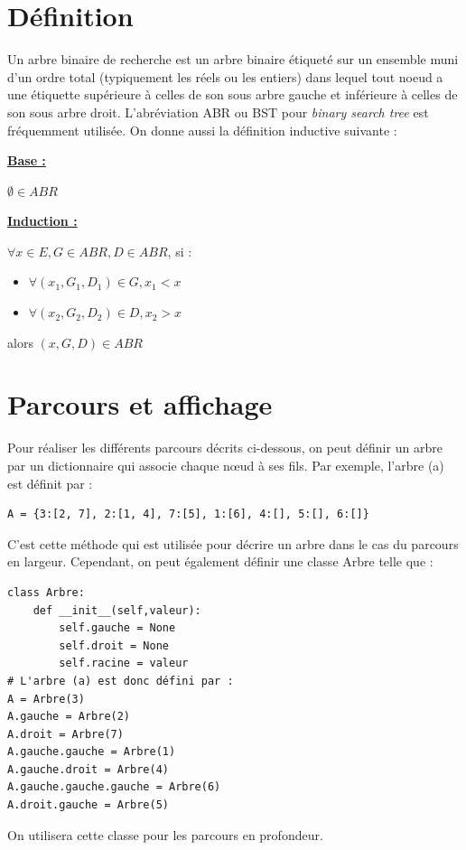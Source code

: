 \documentclass{report}
\begin{document}
\section{Définition}
Un arbre binaire de recherche est un arbre binaire étiqueté sur un ensemble muni d'un ordre total (typiquement les réels ou les entiers) dans lequel tout noeud a une étiquette supérieure à celles de son sous arbre gauche et inférieure à celles de son sous arbre droit. L'abréviation ABR ou BST pour \textit{binary search tree} est fréquemment utilisée. On donne aussi la définition inductive suivante :
\begin{flushleft}
    \bf
    \underline{Base :}
    
\end{flushleft}
$\emptyset \in ABR$
\begin{flushleft}
    \bf
    \underline{Induction :}
\end{flushleft}
    $\forall x \in E, G \in ABR, D \in ABR$, si :
    \begin{itemize}
        \item $\forall (x_1,G_1,D_1) \in G, x_1 < x$
        \item $\forall (x_2,G_2,D_2) \in D, x_2 > x$
    \end{itemize}
    alors $(x,G,D) \in ABR$

\section{Parcours et affichage}

Pour réaliser les différents parcours décrits ci-dessous, on peut définir un arbre par un dictionnaire qui associe chaque nœud à ses fils. Par exemple, l'arbre (a) est définit par :
\begin{lstlisting}
A = {3:[2, 7], 2:[1, 4], 7:[5], 1:[6], 4:[], 5:[], 6:[]}
\end{lstlisting}
C'est cette méthode qui est utilisée pour décrire un arbre dans le cas du parcours en largeur. Cependant, on peut également définir une classe Arbre telle que :
\begin{lstlisting}
class Arbre: 
    def __init__(self,valeur): 
        self.gauche = None
        self.droit = None
        self.racine = valeur
# L'arbre (a) est donc défini par :
A = Arbre(3) 
A.gauche = Arbre(2) 
A.droit = Arbre(7) 
A.gauche.gauche = Arbre(1) 
A.gauche.droit = Arbre(4)
A.gauche.gauche.gauche = Arbre(6)
A.droit.gauche = Arbre(5)
\end{lstlisting}
On utilisera cette classe pour les parcours en profondeur.
\end{document}
